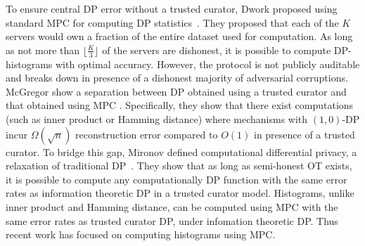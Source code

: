 

To ensure central DP error without a trusted curator, Dwork \etal proposed using standard MPC for computing DP statistics~\cite{dwork2006our}. 
They proposed that each of the $K$ servers would own a fraction of the entire dataset used for computation. 
As long as not more than $\lfloor \frac{K}{3} \rfloor$ of the servers are dishonest, it is possible to compute DP-histograms with optimal accuracy. 
However, the protocol is not publicly auditable and breaks down in presence of a dishonest majority of adversarial corruptions. McGregor \etal show a separation between DP obtained using a trusted curator and that obtained using MPC \cite{mcgregor2010limits}. Specifically, they show that there exist computations (such as inner product or Hamming distance) where mechanisms with $(1, 0)$-DP incur $\Omega(\sqrt{n})$ reconstruction error compared to $O(1)$ in presence of a trusted curator. 
To bridge this gap, Mironov \etal defined computational differential privacy, a relaxation of traditional DP~\cite{mironov2009computational}. They show that as long as semi-honest OT exists, it is possible to compute any computationally DP function with the same error rates as information theoretic DP in a trusted curator model. 
Histograms, unlike inner product and Hamming distance, can be computed using MPC with the same error rates as trusted curator DP, under infomation theoretic DP. 
Thus recent work has focused on computing histograms using MPC. 

